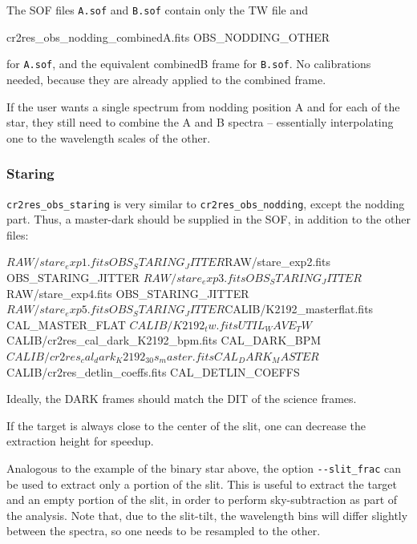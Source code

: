The SOF files \verb!A.sof! and \verb!B.sof! contain only the TW file and
\begin{shell}[fontsize=\small]
    cr2res_obs_nodding_combinedA.fits OBS_NODDING_OTHER
\end{shell}
for \verb!A.sof!, and the equivalent combinedB frame for \verb!B.sof!.
No calibrations needed, because they are already applied to the combined frame.

If the user wants a single spectrum from nodding position A and for each of the
star, they still need to combine the A and B spectra -- essentially interpolating
one to the wavelength scales of the other.


\subsubsection{Staring}

\verb!cr2res_obs_staring! is very similar to \verb!cr2res_obs_nodding!, except
the nodding part. Thus, a master-dark should be supplied in the SOF, in addition
to the other files:
\begin{shell}[fontsize=\small]
$RAW/stare_exp1.fits        OBS_STARING_JITTER
$RAW/stare_exp2.fits        OBS_STARING_JITTER
$RAW/stare_exp3.fits        OBS_STARING_JITTER
$RAW/stare_exp4.fits        OBS_STARING_JITTER
$RAW/stare_exp5.fits        OBS_STARING_JITTER
$CALIB/K2192_masterflat.fits                  CAL_MASTER_FLAT
$CALIB/K2192_tw.fits                          UTIL_WAVE_TW
$CALIB/cr2res_cal_dark_K2192_bpm.fits         CAL_DARK_BPM
$CALIB/cr2res_cal_dark_K2192_30s_master.fits  CAL_DARK_MASTER
$CALIB/cr2res_detlin_coeffs.fits              CAL_DETLIN_COEFFS
\end{shell}  
Ideally, the DARK frames should match the DIT of the science frames.

If the target is always close to the center of the slit, one can decrease the extraction height for speedup.
\begin{shell}[fontsize=\small]
\end{shell}  

Analogous to the example of the binary star above, the option \verb!--slit_frac!
can be used to extract only a portion of the slit. This is useful to extract the
target and an empty portion of the slit, in order to perform sky-subtraction as
part of the analysis. Note that, due to the slit-tilt, the wavelength bins will
differ slightly between the spectra, so one needs to be resampled to the other.

